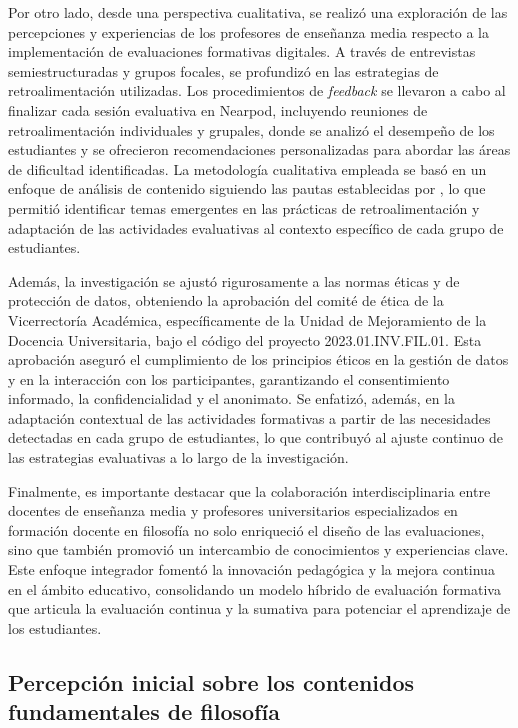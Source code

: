 \documentclass[spanish]{textolivre}
\begin{document}
Por otro lado, desde una perspectiva cualitativa, se realizó una exploración de las percepciones y experiencias de los profesores de enseñanza media respecto a la implementación de evaluaciones formativas digitales. A través de entrevistas semiestructuradas y grupos focales, se profundizó en las estrategias de retroalimentación utilizadas. Los procedimientos de \textit{feedback} se llevaron a cabo al finalizar cada sesión evaluativa en Nearpod, incluyendo reuniones de retroalimentación individuales y grupales, donde se analizó el desempeño de los estudiantes y se ofrecieron recomendaciones personalizadas para abordar las áreas de dificultad identificadas. La metodología cualitativa empleada se basó en un enfoque de análisis de contenido siguiendo las pautas establecidas por \textcite{sandvoll2014}, lo que permitió identificar temas emergentes en las prácticas de retroalimentación y adaptación de las actividades evaluativas al contexto específico de cada grupo de estudiantes.

Además, la investigación se ajustó rigurosamente a las normas éticas y de protección de datos, obteniendo la aprobación del comité de ética de la Vicerrectoría Académica, específicamente de la Unidad de Mejoramiento de la Docencia Universitaria, bajo el código del proyecto 2023.01.INV.FIL.01. Esta aprobación aseguró el cumplimiento de los principios éticos en la gestión de datos y en la interacción con los participantes, garantizando el consentimiento informado, la confidencialidad y el anonimato. Se enfatizó, además, en la adaptación contextual de las actividades formativas a partir de las necesidades detectadas en cada grupo de estudiantes, lo que contribuyó al ajuste continuo de las estrategias evaluativas a lo largo de la investigación.

Finalmente, es importante destacar que la colaboración interdisciplinaria entre docentes de enseñanza media y profesores universitarios especializados en formación docente en filosofía no solo enriqueció el diseño de las evaluaciones, sino que también promovió un intercambio de conocimientos y experiencias clave. Este enfoque integrador fomentó la innovación pedagógica y la mejora continua en el ámbito educativo, consolidando un modelo híbrido de evaluación formativa que articula la evaluación continua y la sumativa para potenciar el aprendizaje de los estudiantes.

\subsection{Percepción inicial sobre los contenidos fundamentales de filosofía}
\end{document}
